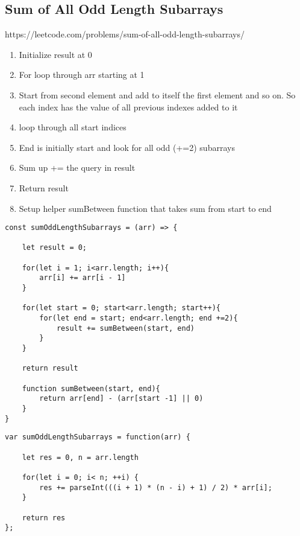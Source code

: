\documentclass[10pt]{article}
\begin{document}
\medskip %

\pagebreak
\medskip %
\subsection{Sum of All Odd Length Subarrays}
https://leetcode.com/problems/sum-of-all-odd-length-subarrays/

\begin{enumerate}
	\item Initialize result at 0 
	\item For loop through arr starting at 1
	\item Start from second element and add to itself the first element and so on. So each index has the value of all previous indexes added to it
	\item loop through all start indices 
	\item End is initially start and look for all odd (+=2) subarrays
	\item Sum up += the query in result 
	\item Return result 
	\item Setup helper sumBetween function that takes sum from start to end 
\end{enumerate}

\begin{lstlisting}[title=Solution sumOddLengthSubarrays with helper function, captionpos=t]
const sumOddLengthSubarrays = (arr) => {

    let result = 0;
 
    for(let i = 1; i<arr.length; i++){
        arr[i] += arr[i - 1]
    }

    for(let start = 0; start<arr.length; start++){
        for(let end = start; end<arr.length; end +=2){
            result += sumBetween(start, end)
        }
    }
    
    return result

    function sumBetween(start, end){
        return arr[end] - (arr[start -1] || 0)
    }
}
\end{lstlisting}

\begin{lstlisting}[title=Solution sumOddLengthSubarrays with parseInt, captionpos=t]
var sumOddLengthSubarrays = function(arr) {

    let res = 0, n = arr.length

    for(let i = 0; i< n; ++i) {
        res += parseInt(((i + 1) * (n - i) + 1) / 2) * arr[i];
    }
    
    return res
};
\end{lstlisting}
\end{document}
